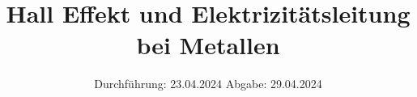 

\subject{V500}
\title{Hall Effekt und Elektrizitätsleitung bei Metallen}
\date{%
  Durchführung: 23.04.2024
  \hspace{3em}
  Abgabe: 29.04.2024
}



\maketitle
\thispagestyle{empty}
\tableofcontents
\newpage






\printbibliography{}



